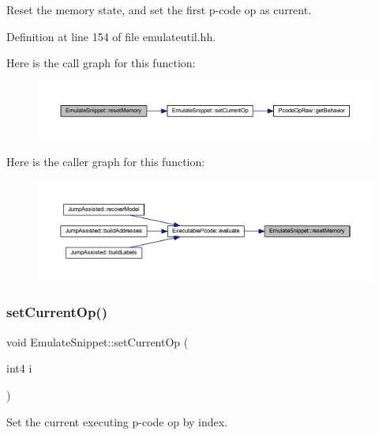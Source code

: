 Reset the memory state, and set the first p-\/code op as current. 

Definition at line 154 of file emulateutil.\+hh.

Here is the call graph for this function\+:
\nopagebreak
\begin{figure}[H]
\begin{center}
\leavevmode
\includegraphics[width=350pt]{class_emulate_snippet_a243812d9450f7d70610e23924def533f_cgraph}
\end{center}
\end{figure}
Here is the caller graph for this function\+:
\nopagebreak
\begin{figure}[H]
\begin{center}
\leavevmode
\includegraphics[width=350pt]{class_emulate_snippet_a243812d9450f7d70610e23924def533f_icgraph}
\end{center}
\end{figure}
\mbox{\label{class_emulate_snippet_ace37ff31a80e1f296221195eeec4a4fb}} 
\subsubsection{\texorpdfstring{setCurrentOp()}{setCurrentOp()}}
{\footnotesize\ttfamily void Emulate\+Snippet\+::set\+Current\+Op (\begin{DoxyParamCaption}\item[{int4}]{i }\end{DoxyParamCaption})\hspace{0.3cm}{\ttfamily [inline]}}



Set the current executing p-\/code op by index. 

